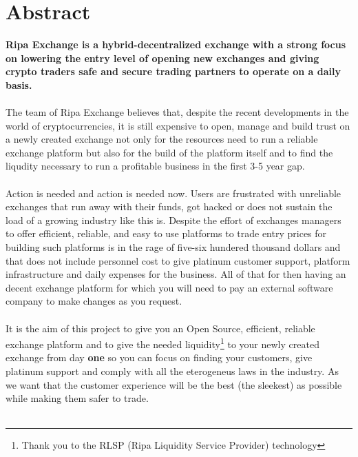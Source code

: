 \documentclass[11pt,fleqn]{book} %
\begin{document}
\section{Abstract}
\textbf{Ripa Exchange is a hybrid-decentralized exchange with a strong focus on lowering the entry level
of opening new exchanges and giving crypto traders safe and secure trading partners to operate on a daily basis.}\\\\
The team of Ripa Exchange believes that, despite the recent developments in the world of
cryptocurrencies, it is still expensive to open, manage and build trust on a newly created exchange not
only for the resources need to run a reliable exchange platform but also for the build of the platform 
itself and to find the liqudity necessary to run a profitable business in the first 3-5 year gap.\\\\
Action is needed and action is needed now. Users are frustrated with unreliable exchanges that run away
with their funds, got hacked or does not sustain the load of a growing industry like this is. Despite
the effort of exchanges managers to offer efficient, reliable, and easy to use platforms to trade entry
prices for building such platforms is in the rage of five-six hundered thousand dollars and that does not 
include personnel cost to give platinum customer support, platform infrastructure and daily expenses for
the business. All of that for then having an decent exchange platform for which you will need to pay an 
external software company to make changes as you request.\\\\
It is the aim of this project to give you an Open Source, efficient, reliable exchange platform and to
give the needed liquidity\footnote{Thank you to the RLSP (Ripa Liquidity Service Provider) technology} to your newly created exchange from day \textbf{one} so you can focus on
finding your customers, give platinum support and comply with all the eterogeneus laws in the industry.
As we want that the customer experience will be the best (the sleekest) as possible while making them safer to trade.\\\\


\end{document}
